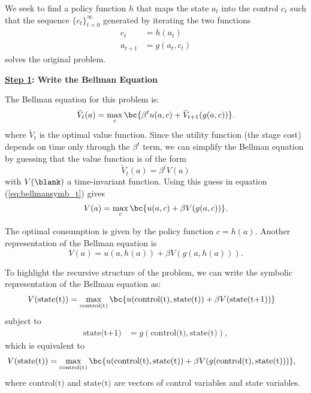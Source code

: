 \documentclass[\topdir/lecture\_notes.tex]{subfiles}
\begin{document}
We seek to find a policy function $h$ that maps the state $a_{t}$ into the control $c_{t}$ such that the sequence
$\{c_{t}\}_{t=0}^{\infty}$ generated by iterating the two functions
\begin{align*}
c_{t} & =h(a_{t}) \\
a_{t+1} & =g(a_{t},c_{t})
\end{align*}
solves the original problem.

\textbf{\underline{Step 1}: Write the Bellman Equation}

The Bellman equation for this problem is:
\begin{equation}
\tilde{V}_t(a)=\max_{c}\bc{\beta^t u(a,c)+ \tilde{V}_{t+1}(g(a,c))}.\label{eq:bellmansymb_t}
\end{equation}
where $\tilde{V}_t$ is the optimal value function. Since the utility function (the stage cost) depends on time only through the $\beta^t$ term, we can simplify the Bellman equation by guessing that the value function is of the form
\begin{equation*}
    \tilde{V}_t(a) = \beta^t V(a)
\end{equation*}
with $V(\blank)$ a time-invariant function. Using this guess in equation (\ref{eq:bellmansymb_t}) gives
\begin{equation}
V(a)=\max_{c}\bc{u(a,c)+\beta V(g(a,c))}.\label{eq:bellmansymb}
\end{equation}

The optimal consumption is given by the policy function $c=h(a)$. Another representation of the Bellman equation is 
\begin{equation}
V(a)=u(a,h(a))+\beta V(g(a,h(a))).\label{eq:bellmansymb2}
\end{equation}

To highlight the recursive structure of the problem, we can write the symbolic representation of
the Bellman equation as:
\begin{align*}
V(\text{state(t)})&= \max_{\text{control(t)}}\bc{u(\text{control(t)},\text{state(t)})+\beta V(\text{state(t+1)})}
\end{align*}
subject to
\begin{align*}
\text{state(t+1)}&=g(\text{control(t)},\text{state(t)}),
\end{align*}
which is equivalent to
\begin{align*}
V(\text{state(t)})&= \max_{\text{control(t)}}\bc{u(\text{control(t)},\text{state(t)})+\beta  V(g(\text{control(t)},\text{state(t)}))},
\end{align*}
where $\text{control(t)}$ and $\text{state(t)}$ are vectors of control variables and state variables.
\end{document}
